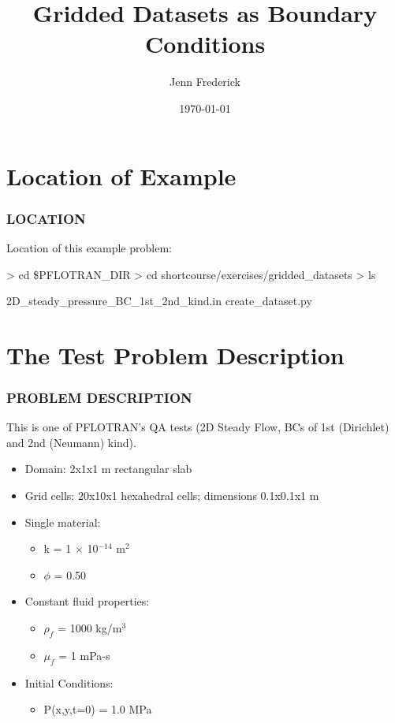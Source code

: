 \documentclass{beamer}
\begin{document}
\title{Gridded Datasets as Boundary Conditions}
\author{Jenn Frederick}
\date{\today}


\section{Location of Example}

\begin{frame}\frametitle{LOCATION}

Location of this example problem:

\begin{semiverbatim}
> cd \$PFLOTRAN_DIR
> cd shortcourse/exercises/gridded_datasets
> ls

2D_steady_pressure_BC_1st_2nd_kind.in
create_dataset.py
\end{semiverbatim}

\end{frame}

\section{The Test Problem Description}

\begin{frame}\frametitle{PROBLEM DESCRIPTION}

This is one of PFLOTRAN's QA tests (2D Steady Flow, BCs of 1st (Dirichlet) and 2nd (Neumann) kind).
  \begin{itemize}
    \item Domain: 2x1x1 m rectangular slab
    \item Grid cells: 20x10x1 hexahedral cells; dimensions 0.1x0.1x1 m
    \item Single material:
    \begin{itemize}
      \item k = 1 $\times$ 10$^{-14}$ m$^{2}$
      \item $\phi$ = 0.50
    \end{itemize}
    \item Constant fluid properties:
    \begin{itemize}
      \item $\rho_{f}$ = 1000 kg/m$^{3}$
      \item $\mu_{f}$ = 1 mPa-s
    \end{itemize}
    \item Initial Conditions:
    \begin{itemize}
      \item P(x,y,t=0) = 1.0 MPa
    \end{itemize}
    
  \end{itemize}

\end{frame}
\end{document}
